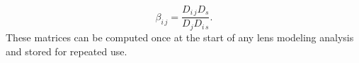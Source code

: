 \begin{equation}
\beta_{i\,j} = \frac{D_{i\,j} D_s}{D_{j}D_{i\,s}}.
\end{equation}
These matrices can be computed once at the start of any lens modeling analysis and stored for repeated use.